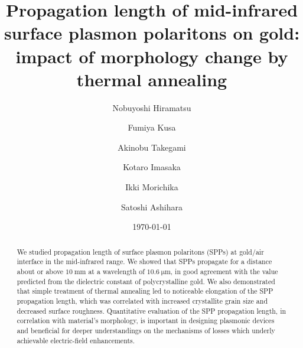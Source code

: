 \documentclass[aip,apl,reprint]{revtex4-1}
\begin{document}
\title{Propagation length of mid-infrared surface plasmon polaritons \color{red}on gold: impact of morphology change by thermal annealing\color{black}}
\author{Nobuyoshi Hiramatsu}
\author{Fumiya Kusa}
\author{Akinobu Takegami}
\author{Kotaro Imasaka}
\author{Ikki Morichika}
\author{Satoshi Ashihara}

\date{\today}

\begin{abstract}
We \color{red}studied \color{black}propagation length of surface plasmon polaritons (SPPs) at gold/air interface \color{red}in the mid-infrared range. \color{black}We showed that SPPs propagate for a distance \color{red}about or above \color{black}$10\:\mathrm{mm}$ at a wavelength of $10.6\:\mathrm{\mu m}$, in good agreement with the value predicted from the dielectric constant of polycrystalline gold. We \color{red}also \color{black}demonstrated that \color{red}simple treatment of thermal annealing led to noticeable elongation of the SPP propagation length, which was correlated with increased crystallite grain size and decreased surface roughness. \color{black}Quantitative evaluation of the SPP propagation length, \color{red}in correlation with material's morphology, \color{black}is important in designing plasmonic devices and beneficial for deeper understandings on the mechanisms of losses \color{red}which underly \color{black}achievable electric-field enhancements.
\end{abstract}

\maketitle
 
\end{document}
